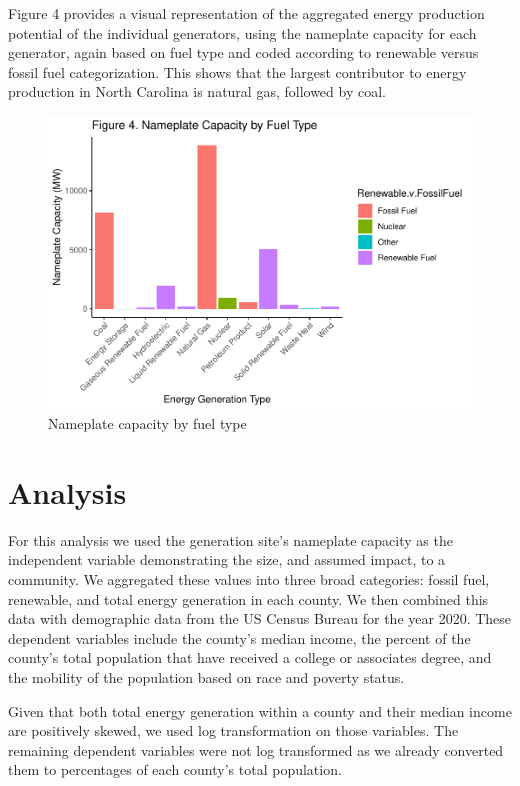 \documentclass[
  12pt,
]{article}
\begin{document}
Figure 4 provides a visual representation of the aggregated energy
production potential of the individual generators, using the nameplate
capacity for each generator, again based on fuel type and coded
according to renewable versus fossil fuel categorization. This shows
that the largest contributor to energy production in North Carolina is
natural gas, followed by coal.

\begin{figure}
\centering
\includegraphics{Project_files/figure-latex/unnamed-chunk-4-1.pdf}
\caption{Nameplate capacity by fuel type}
\end{figure}

\newpage

\hypertarget{analysis}{%
\section{Analysis}\label{analysis}}

For this analysis we used the generation site's nameplate capacity as
the independent variable demonstrating the size, and assumed impact, to
a community. We aggregated these values into three broad categories:
fossil fuel, renewable, and total energy generation in each county. We
then combined this data with demographic data from the US Census Bureau
for the year 2020. These dependent variables include the county's median
income, the percent of the county's total population that have received
a college or associates degree, and the mobility of the population based
on race and poverty status.

Given that both total energy generation within a county and their median
income are positively skewed, we used log transformation on those
variables. The remaining dependent variables were not log transformed as
we already converted them to percentages of each county's total
population.
\end{document}
